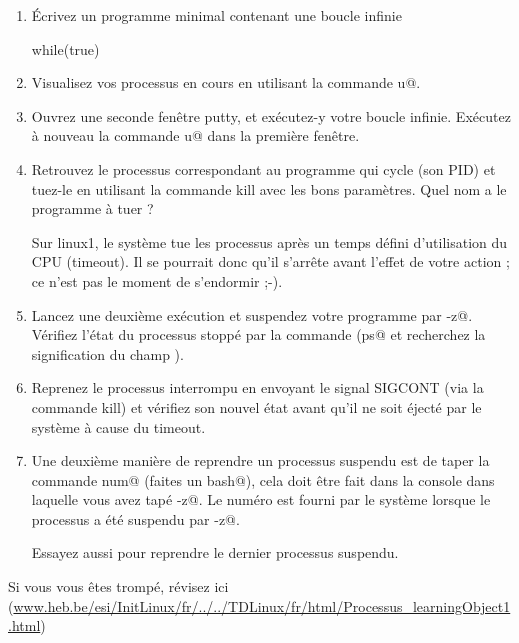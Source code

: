 \documentclass[11pt,a4paper]{article}
\begin{document}
					\begin{enumerate}
				
			\item 
						\'Ecrivez un programme minimal 
						contenant une boucle infinie
						\begin{Java}
	while(true){}
						\end{Java}
			\item 
						Visualisez vos processus en cours en utilisant la commande 
						\verb@ps u@.
					
			\item 
						Ouvrez une seconde fen\^etre putty, et ex\'ecutez-y 
						votre boucle infinie.
						Ex\'ecutez \`a nouveau la commande 
						\verb@ps u@
						dans la premi\`ere fen\^etre.
					
			\item 
						Retrouvez le processus correspondant au programme 
						qui cycle (son PID)
						et tuez-le en utilisant la commande kill
						avec les bons param\`etres. Quel nom a le programme \`a tuer ?
						
            \par
        
						Sur linux1,
						le syst\`eme tue les processus apr\`es un temps d\'efini
						d'utilisation du CPU (timeout). Il se pourrait donc
						qu'il s'arr\^ete avant l'effet de votre action ;
						ce n'est pas le moment de s'endormir ;-).
						
            \par
        
			\item 
						Lancez une deuxi\`eme ex\'ecution et suspendez votre programme 
						par \verb@Ctrl-z@.
						V\'erifiez l'\'etat du processus stopp\'e par la commande 
						\verb@ps@
						(\verb@man ps@ et recherchez 
						la signification du champ 
						\verb@STAT@).
					
			\item 
						Reprenez le processus interrompu en envoyant le signal 
						SIGCONT (via la commande kill) 
						et v\'erifiez son nouvel \'etat avant qu'il ne soit \'eject\'e par 
						le syst\`eme \`a cause du \guillemotleft timeout\guillemotright .
					
			\item 
						Une deuxi\`eme mani\`ere de reprendre un processus suspendu
						est de taper la commande
						\verb@fg num@ 
						(faites un \verb@man bash@),
						cela doit \^etre fait dans la console dans laquelle vous 
						avez tap\'e \verb@Ctrl-z@.
						Le num\'ero \verb@num@
						est fourni par le syst\`eme lorsque le processus 
						a \'et\'e suspendu par \verb@Ctrl-z@.
						
            \par
        
						Essayez aussi \verb@fg@ 
						pour reprendre le dernier processus suspendu.
						
            \par
        
					\end{enumerate}
				 Si vous vous \^etes tromp\'e, r\'evisez ici (\url{www.heb.be/esi/InitLinux/fr/../../TDLinux/fr/html/Processus\_learningObject1.html})
            \par
        
				
\end{document}
